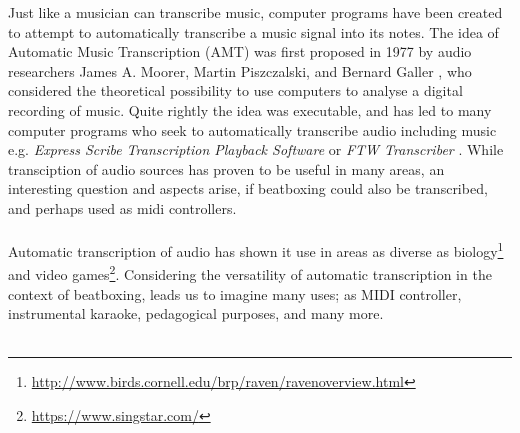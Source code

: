 
Just like a musician can transcribe music, computer programs have been created to attempt to automatically transcribe a music signal into its notes. The idea of Automatic Music Transcription (AMT) was first proposed in 1977 by audio researchers James A. Moorer, Martin Piszczalski, and Bernard Galler \citep{Scheirer1998}, who considered the theoretical possibility to use computers to analyse a digital recording of music. Quite rightly the idea was executable, and has led to many computer programs who seek to automatically transcribe audio including music e.g. \textit{ Express Scribe Transcription Playback Software } or \textit{ FTW Transcriber }. While transciption of audio sources has proven to be useful in many areas, an interesting question and aspects arise, if beatboxing could also be transcribed, and perhaps used as midi controllers.\\\\
Automatic transcription of audio has shown it use in areas as diverse as biology\footnote{\url{http://www.birds.cornell.edu/brp/raven/ravenoverview.html}} and video games\footnote{\url{https://www.singstar.com/}}. Considering the versatility of automatic transcription in the context of beatboxing, leads us to imagine many uses; as MIDI controller, instrumental karaoke, pedagogical purposes, and many more.\\\\




